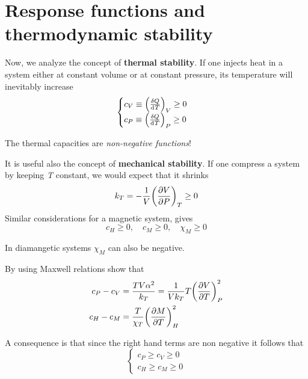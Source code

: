 \documentclass[../main/main.tex]{subfiles}
\begin{document}
\section{Response functions and thermodynamic stability}
Now, we analyze the concept of \textbf{thermal stability}. If one injects heat in a system either at constant volume or at constant pressure, its temperature will inevitably increase
\begin{equation}
  \begin{cases}
   c_V \equiv \qty(\frac{\delta Q}{\dd[]{T} })_V \ge 0  \\
   c_P \equiv \qty(\frac{\delta Q}{\dd[]{T} })_P \ge 0
  \end{cases}
\label{eq:}
\end{equation}
\begin{remark}
The thermal capacities are \emph{non-negative functions}!
\end{remark}
It is useful also the concept of \textbf{mechanical stability}. If one compress a system by keeping \emph{T} constant, we would expect that it shrinks
\begin{equation}
  k_T = - \frac{1}{V} \qty(\pdv{V}{P} )_T \ge 0
  \label{eq:}
\end{equation}
Similar considerations for a magnetic system, gives
\begin{equation}
  c_H \ge 0, \quad c_M \ge 0, \quad \chi_M \ge 0
  \label{eq:}
\end{equation}
\begin{remark}
In diamangetic systems \( \chi_M \) can also be negative.
\end{remark}

\begin{exercise}
By using Maxwell relations show that
\begin{subequations}
\begin{align}
  c_P - c_V &= \frac{T V \alpha ^2}{k_T} = \frac{1}{V k_T} T \qty(\pdv{V}{T} )_P^2 \\
  c_H - c_M &= \frac{T}{\chi _T} \qty(\pdv{M}{T} )_H^2
\end{align}
\label{}
\end{subequations}
\end{exercise}
\noindent A consequence is that since the right hand terms are non negative it follows that
\begin{equation}
  \begin{cases}
   c_P \ge c_V \ge 0  \\
   c_H \ge c_M \ge 0
  \end{cases}
\label{eq:}
\end{equation}
\end{document}
